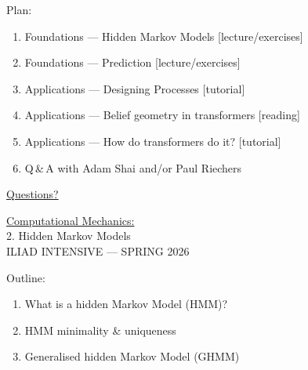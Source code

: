 \documentclass[aspectratio=169,11pt]{beamer}
\begin{document}
\begin{frame}{Plan:}
  \vspace{0.8em}
  \begin{enumerate}
    \item Foundations --- Hidden Markov Models \hfill [lecture/exercises]
    \vspace{0.4em}
    \item Foundations --- Prediction \hfill [lecture/exercises]
    \vspace{0.4em}
    \item Applications --- Designing Processes \hfill [tutorial]
    \vspace{0.4em}
    \item Applications --- Belief geometry in transformers \hfill [reading]
    \vspace{0.4em}
    \item Applications --- How do transformers do it? \hfill [tutorial]
    \vspace{0.4em}
    \item Q\,\&\,A with Adam Shai and/or Paul Riechers
  \end{enumerate}
\end{frame}

\begin{frame}[plain]
  \vfill
  \begin{center}
    {\Huge \underline{Questions?}}
  \end{center}
  \vfill
\end{frame}

\begin{frame}[plain]
  \vfill
  \begin{center}
    {\LARGE \underline{Computational Mechanics:}}\\[2em]
    {\LARGE 2. Hidden Markov Models}\\[4em]
    {\large ILIAD INTENSIVE --- SPRING 2026}
  \end{center}
  \vfill
\end{frame}

\begin{frame}{Outline:}
  \vspace{1em}
  \begin{enumerate}
    \item What is a hidden Markov Model (HMM)?
    \vspace{0.4em}
    \item HMM minimality \& uniqueness
    \vspace{0.4em}
    \item Generalised hidden Markov Model (GHMM)
  \end{enumerate}
\end{frame}
\end{document}

